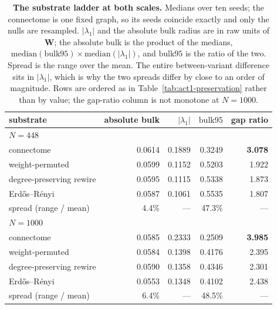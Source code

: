 \begin{table}[ht]
    \centering
    \caption[The substrate ladder at both scales]{\textbf{The substrate ladder
    at both scales.} Medians over ten seeds; the connectome is one fixed graph,
    so its seeds coincide exactly and only the nulls are resampled.
    $|\lambda_1|$ and the absolute bulk radius are in raw units of $\mathbf{W}$; the
    absolute bulk is the product of the medians,
    $\mathrm{median}(\mathrm{bulk95}) \times \mathrm{median}(|\lambda_1|)$, and
    $\mathrm{bulk95}$ is the ratio of the two. Spread is the range over the
    mean. The entire between-variant difference sits in $|\lambda_1|$, which is
    why the two spreads differ by close to an order of magnitude. 
    Rows are ordered as in Table~\ref{tab:act1-preservation} rather than by value; 
    the gap-ratio column is not monotone at $N = 1000$.}
    \label{tab:act1-ladder}
    \begin{tabular}{lrrrr}
        \toprule
        substrate & absolute bulk & $|\lambda_1|$ & $\mathrm{bulk95}$ & gap ratio \\
        \midrule
        \multicolumn{5}{l}{\emph{$N = 448$}} \\
        connectome & 0.0614 & 0.1889 & 0.3249 & \textbf{3.078} \\ %
        weight-permuted & 0.0599 & 0.1152 & 0.5203 & 1.922 \\ %
        degree-preserving rewire & 0.0595 & 0.1115 & 0.5338 & 1.873 \\ %
        Erdős–Rényi & 0.0587 & 0.1061 & 0.5535 & 1.807 \\ %
        \addlinespace
        spread (range / mean) & 4.4\% & --- & 47.3\% & --- \\ %
        \midrule
        \multicolumn{5}{l}{\emph{$N = 1000$}} \\
        connectome & 0.0585 & 0.2333 & 0.2509 & \textbf{3.985} \\ %
        weight-permuted & 0.0584 & 0.1398 & 0.4176 & 2.395 \\ %
        degree-preserving rewire & 0.0590 & 0.1358 & 0.4346 & 2.301 \\ %
        Erdős–Rényi & 0.0553 & 0.1348 & 0.4102 & 2.438 \\ %
        \addlinespace
        spread (range / mean) & 6.4\% & --- & 48.5\% & --- \\ %
        \bottomrule
    \end{tabular}
\end{table}


